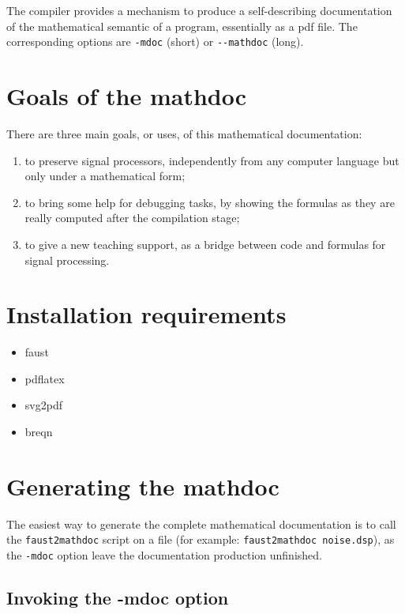 \documentclass[a4paper]{book}
\begin{document}
The \faust compiler provides a mechanism to produce a self-describing documentation of the mathematical semantic of a \faust program, essentially as a pdf file. The corresponding options are \lstinline!-mdoc! (short) or \lstinline!--mathdoc! (long).

\section{Goals of the mathdoc}
\label{sec:goals-of-mdoc}

There are three main goals, or uses, of this mathematical documentation:
\begin{enumerate}
\item to preserve signal processors, independently from any computer language but only under a mathematical form;
\item to bring some help for debugging tasks, by showing the formulas as they are really computed after the compilation stage;
\item to give a new teaching support, as a bridge between code and formulas for signal processing.
\end{enumerate}

\section{Installation requirements}
\label{sec:inst-requ}

\begin{itemize}
\item faust
\item pdflatex
\item svg2pdf
\item breqn
\end{itemize}


\section{Generating the mathdoc}
\label{sec:generating-mdoc}

The easiest way to generate the complete mathematical documentation is to call the \lstinline!faust2mathdoc! script on a \faust file (for example: \lstinline!faust2mathdoc noise.dsp!), as the \lstinline!-mdoc! option leave the documentation production unfinished.

\subsection{Invoking the -mdoc option}
\label{sec:invoking-mdoc}
\end{document}
